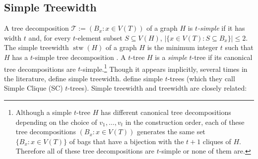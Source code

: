 \documentclass[kpfonts]{patmorin}
\DeclareMathOperator{\stw}{stw}
\theoremstyle{named}
\begin{document}
%
%
%
%

\subsection{Simple Treewidth}


A tree decomposition $\mathcal{T}:=(B_x:x\in V(T))$ of a graph $H$ is \emph{$t$-simple} if it has width $t$ and, for every $t$-element subset $S\subseteq V(H)$, $|\{x\in V(T):S\subseteq B_x\}|\le 2$.  The simple treewidth $\stw(H)$ of a graph $H$ is the minimum integer $t$ such that $H$ has a $t$-simple tree decomposition \cite{knauer.ueckerdt:simple}.  A $t$-tree $H$ is a \emph{simple} $t$-tree if its canonical tree decompositions are $t$-simple.\footnote{Although a simple $t$-tree $H$ has different canonical tree decompositions depending on the choice of $v_1,\ldots,v_t$ in the construction order, each of these tree decompositions $(B_x:x\in V(T))$ generates the same set $\{B_x:x\in V(T)\}$ of bags that have a bijection with the $t+1$ cliques of $H$.  Therefore all of these tree decompositions are $t$-simple or none of them are.}  Though it appears implicitly, several times in the literature, \citet{knauer.ueckerdt:simple} define simple treewidth.  \citet{markenzon.justel.ea:subclasses} define simple $t$-trees (which they call Simple Clique (SC) $t$-trees).  Simple treewidth and treewidth are closely related:
\end{document}
